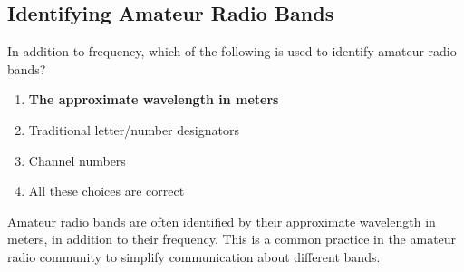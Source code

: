 \subsection{Identifying Amateur Radio Bands}
\label{T3B07}

\begin{tcolorbox}[colback=gray!10!white,colframe=black!75!black,title=T3B07]
In addition to frequency, which of the following is used to identify amateur radio bands?
\begin{enumerate}[noitemsep]
    \item \textbf{The approximate wavelength in meters}
    \item Traditional letter/number designators
    \item Channel numbers
    \item All these choices are correct
\end{enumerate}
\end{tcolorbox}

Amateur radio bands are often identified by their approximate wavelength in meters, in addition to their frequency. This is a common practice in the amateur radio community to simplify communication about different bands.